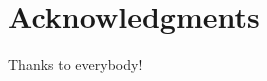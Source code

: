 \documentclass[aps,pre,twocolumn,nofootinbib,superscriptaddress,linenumbers]{revtex4-1}
\begin{document}
\section{Acknowledgments}
\label{section:acknowledgments}

Thanks to everybody!


 

\end{document}
